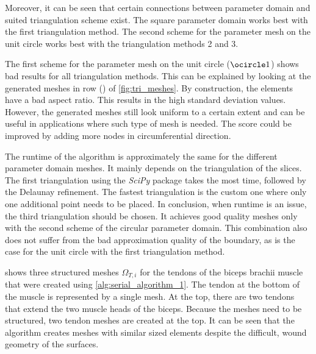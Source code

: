 Moreover, it can be seen that certain connections between parameter domain and suited triangulation scheme exist. The square parameter domain works best with the first triangulation method. The second scheme for the parameter mesh on the unit circle works best with the triangulation methods 2 and 3.

The first scheme for the parameter mesh on the unit circle ($\ocircle 1$) shows bad results for all triangulation methods. This can be explained by looking at the generated meshes in row () of \cref{fig:tri_meshes}. By construction, the elements have a bad aspect ratio. This results in the high standard deviation values. However, the generated meshes still look uniform to a certain extent and can be useful in applications where such type of mesh is needed. The score could be improved by adding more nodes in circumferential direction.

The runtime of the algorithm is approximately the same for the different parameter domain meshes. It mainly depends on the triangulation of the slices. The first triangulation using the \emph{SciPy} package takes the most time, followed by the Delaunay refinement. The fastest triangulation is the custom one where only one additional point needs to be placed. In conclusion, when runtime is an issue, the third triangulation should be chosen. It achieves good quality meshes only with the second scheme of the circular parameter domain. This combination also does not suffer from the bad approximation quality of the boundary, as is the case for the unit circle with the first triangulation method.

 shows three structured meshes $\Omega_{T,i}$ for the tendons of the biceps brachii muscle that were created using \cref{alg:serial_algorithm_1}. The tendon at the bottom of the muscle is represented by a single mesh. At the top, there are two tendons that extend the two muscle heads of the biceps. Because the meshes need to be structured, two tendon meshes are created at the top. It can be seen that the algorithm creates meshes with similar sized elements despite the difficult, wound geometry of the surfaces.

